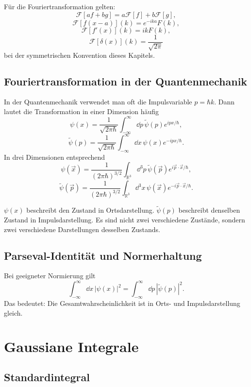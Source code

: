 \begin{formulabox}
Für die Fouriertransformation gelten:
\[
    \mathcal{F}[af+bg]=a\mathcal{F}[f]+b\mathcal{F}[g],
\]
\[
    \mathcal{F}[f(x-a)](k)=e^{-ika}F(k),
\]
\[
    \mathcal{F}[f'(x)](k)=ikF(k),
\]
\[
    \mathcal{F}[\delta(x)](k)=\frac{1}{\sqrt{2\pi}}
\]
bei der symmetrischen Konvention dieses Kapitels.
\end{formulabox}

\subsection{Fouriertransformation in der Quantenmechanik}

In der Quantenmechanik verwendet man oft die Impulsvariable $p=\hbar k$. Dann lautet die Transformation in einer Dimension häufig
\[
    \psi(x)=\frac{1}{\sqrt{2\pi\hbar}}\int_{-\infty}^{\infty}\dd p\,\widetilde\psi(p)e^{ipx/\hbar},
\]
\[
    \widetilde\psi(p)=\frac{1}{\sqrt{2\pi\hbar}}\int_{-\infty}^{\infty}\dd x\,\psi(x)e^{-ipx/\hbar}.
\]
In drei Dimensionen entsprechend
\[
    \psi(\vec x)=\frac{1}{(2\pi\hbar)^{3/2}}\int_{\mathbb{R}^3}\dd^3p\,\widetilde\psi(\vec p)e^{i\vec p\cdot\vec x/\hbar},
\]
\[
    \widetilde\psi(\vec p)=\frac{1}{(2\pi\hbar)^{3/2}}\int_{\mathbb{R}^3}\dd^3x\,\psi(\vec x)e^{-i\vec p\cdot\vec x/\hbar}.
\]

\begin{conceptbox}
$\psi(x)$ beschreibt den Zustand in Ortsdarstellung. $\widetilde\psi(p)$ beschreibt denselben Zustand in Impulsdarstellung. Es sind nicht zwei verschiedene Zustände, sondern zwei verschiedene Darstellungen desselben Zustands.
\end{conceptbox}

\subsection{Parseval-Identität und Normerhaltung}

Bei geeigneter Normierung gilt
\[
    \int_{-\infty}^{\infty}\dd x\,|\psi(x)|^2
    =
    \int_{-\infty}^{\infty}\dd p\,|\widetilde\psi(p)|^2.
\]
Das bedeutet: Die Gesamtwahrscheinlichkeit ist in Orts- und Impulsdarstellung gleich.

\section{Gaussiane Integrale}

\subsection{Standardintegral}

